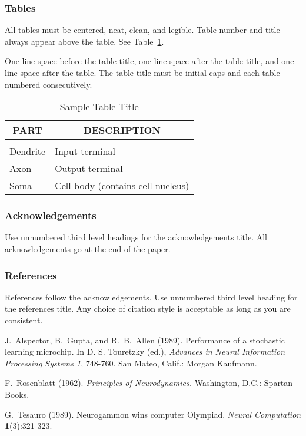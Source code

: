 \documentclass[letterpaper]{article}
\begin{document}
\subsubsection{Tables}

All tables must be centered, neat, clean, and legible. Table number
and title always appear above the table.  See
Table~\ref{sample-table}.

One line space before the table title, one line space after the table
title, and one line space after the table. The table title must be
initial caps and each table numbered consecutively.

\begin{table}[h]
\caption{Sample Table Title}
\label{sample-table}
\begin{center}
\begin{tabular}{ll}
\multicolumn{1}{c}{\bf PART}  &\multicolumn{1}{c}{\bf DESCRIPTION} \\
\hline \\
Dendrite         &Input terminal \\
Axon             &Output terminal \\
Soma             &Cell body (contains cell nucleus) \\
\end{tabular}
\end{center}
\end{table}

\newpage

\subsubsection*{Acknowledgements}

Use unnumbered third level headings for the acknowledgements title.
All acknowledgements go at the end of the paper.


\subsubsection*{References}

References follow the acknowledgements.  Use unnumbered third level
heading for the references title.  Any choice of citation style is
acceptable as long as you are consistent.


J.~Alspector, B.~Gupta, and R.~B.~Allen  (1989). Performance of a
stochastic learning microchip.  In D. S. Touretzky (ed.), {\it Advances
in Neural Information Processing Systems 1}, 748-760.  San Mateo, Calif.:
Morgan Kaufmann.

F.~Rosenblatt (1962). {\it Principles of Neurodynamics.} Washington,
D.C.: Spartan Books.

G.~Tesauro (1989). Neurogammon wins computer Olympiad.  {\it Neural
Computation} {\bf 1}(3):321-323.
\end{document}

